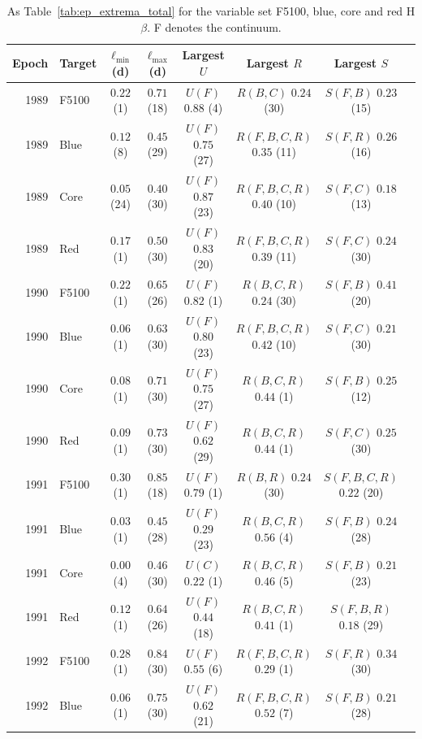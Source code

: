 \documentclass[fleqn,usenatbib]{mnras}
\newenvironment{SURDtable}{\begin{table}}{\end{table}}
\begin{document}
\begin{SURDtable}
\centering
\caption{As Table~\ref{tab:ep_extrema_total} for the variable set F5100, blue, core and red
H$\beta$. F denotes the continuum.}
\label{tab:ep_extrema_cont}
\footnotesize
\setlength{\tabcolsep}{3pt}
\begin{tabular}{rlcccccc}
\toprule
Epoch & Target & $\ell_{\min}$ (d) & $\ell_{\max}$ (d) & Largest $U$ & Largest $R$ & Largest $S$ \\
\midrule
1989 & F5100 & $0.22$ (1) & $0.71$ (18) & $U(F)$ $0.88$ (4) & $R(B,C)$ $0.24$ (30) & $S(F,B)$ $0.23$ (15) \\
1989 & Blue & $0.12$ (8) & $0.45$ (29) & $U(F)$ $0.75$ (27) & $R(F,B,C,R)$ $0.35$ (11) & $S(F,R)$ $0.26$ (16) \\
1989 & Core & $0.05$ (24) & $0.40$ (30) & $U(F)$ $0.87$ (23) & $R(F,B,C,R)$ $0.40$ (10) & $S(F,C)$ $0.18$ (13) \\
1989 & Red & $0.17$ (1) & $0.50$ (30) & $U(F)$ $0.83$ (20) & $R(F,B,C,R)$ $0.39$ (11) & $S(F,C)$ $0.24$ (30) \\
\midrule
1990 & F5100 & $0.22$ (1) & $0.65$ (26) & $U(F)$ $0.82$ (1) & $R(B,C,R)$ $0.24$ (30) & $S(F,B)$ $0.41$ (20) \\
1990 & Blue & $0.06$ (1) & $0.63$ (30) & $U(F)$ $0.80$ (23) & $R(F,B,C,R)$ $0.42$ (10) & $S(F,C)$ $0.21$ (30) \\
1990 & Core & $0.08$ (1) & $0.71$ (30) & $U(F)$ $0.75$ (27) & $R(B,C,R)$ $0.44$ (1) & $S(F,B)$ $0.25$ (12) \\
1990 & Red & $0.09$ (1) & $0.73$ (30) & $U(F)$ $0.62$ (29) & $R(B,C,R)$ $0.44$ (1) & $S(F,C)$ $0.25$ (30) \\
\midrule
1991 & F5100 & $0.30$ (1) & $0.85$ (18) & $U(F)$ $0.79$ (1) & $R(B,R)$ $0.24$ (30) & $S(F,B,C,R)$ $0.22$ (20) \\
1991 & Blue & $0.03$ (1) & $0.45$ (28) & $U(F)$ $0.29$ (23) & $R(B,C,R)$ $0.56$ (4) & $S(F,B)$ $0.24$ (28) \\
1991 & Core & $0.00$ (4) & $0.46$ (30) & $U(C)$ $0.22$ (1) & $R(B,C,R)$ $0.46$ (5) & $S(F,B)$ $0.21$ (23) \\
1991 & Red & $0.12$ (1) & $0.64$ (26) & $U(F)$ $0.44$ (18) & $R(B,C,R)$ $0.41$ (1) & $S(F,B,R)$ $0.18$ (29) \\
\midrule
1992 & F5100 & $0.28$ (1) & $0.84$ (30) & $U(F)$ $0.55$ (6) & $R(F,B,C,R)$ $0.29$ (1) & $S(F,R)$ $0.34$ (30) \\
1992 & Blue & $0.06$ (1) & $0.75$ (30) & $U(F)$ $0.62$ (21) & $R(F,B,C,R)$ $0.52$ (7) & $S(F,B)$ $0.21$ (28) \\

\end{tabular}
\end{SURDtable}
\end{document}
